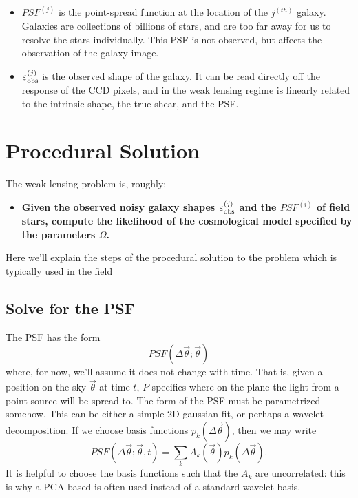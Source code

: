 \documentclass[12pt]{article}
\begin{document}
\begin{itemize}
  \item $PSF^{(j)}$ is the point-spread function at the location of the
    $j^{(th)}$ galaxy.  Galaxies are collections of billions of stars, and
    are too far away for us to resolve the stars individually.  This PSF
    is not observed, but affects the observation of the galaxy image.

  \item $\varepsilon^{(j)}_{\rm obs}$ is the observed shape of the galaxy.
    It can be read directly off the response of the CCD pixels, and
    in the weak lensing regime is linearly related to the intrinsic
    shape, the true shear, and the PSF.
\end{itemize}

\section{Procedural Solution}
The weak lensing problem is, roughly:

\begin{itemize}
\item{\bf Given the observed noisy galaxy shapes $\varepsilon^{(j)}_{\rm obs}$
  and the $PSF^{(i)}$ of field stars, compute the likelihood of the
  cosmological model specified by the parameters $\Omega$.}
\end{itemize}

Here we'll explain the steps of the procedural solution to the problem
which is typically used in the field

\subsection{Solve for the PSF}
The PSF has the form
\begin{equation}
  PSF(\Delta\vec{\theta}; \vec{\theta})
\end{equation}
where, for now, we'll assume it does not change with time.
That is, given a position on the sky $\vec{\theta}$ at time $t$, $P$
specifies where on the plane the light from a point source will be
spread to.  The form of the PSF must be parametrized somehow.  This can
be either a simple 2D gaussian fit, or perhaps a wavelet decomposition.
If we choose basis functions $p_k(\Delta\vec{\theta})$, then we may write
\begin{equation}
  PSF(\Delta\vec{\theta}; \vec{\theta}, t)
  = \sum_k A_k(\vec\theta) p_k(\Delta\vec{\theta}).
\end{equation}
It is helpful to choose the basis functions such that the $A_k$ are
uncorrelated: this is why a PCA-based is often used instead of a standard
wavelet basis.
\end{document}
